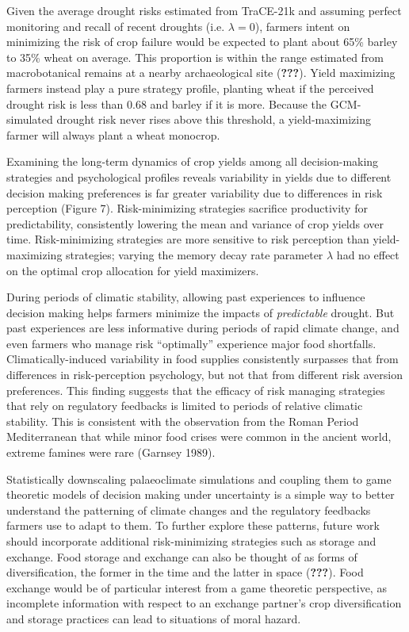 \documentclass[smallextended]{svjour3}       %
\begin{document}
Given the average drought risks estimated from TraCE-21k and assuming
perfect monitoring and recall of recent droughts (i.e. \(\lambda = 0\)),
farmers intent on minimizing the risk of crop failure would be expected
to plant about 65\% barley to 35\% wheat on average. This proportion is
within the range estimated from macrobotanical remains at a nearby
archaeological site ({\textbf{???}}). Yield maximizing farmers instead
play a pure strategy profile, planting wheat if the perceived drought
risk is less than 0.68 and barley if it is more. Because the
GCM-simulated drought risk never rises above this threshold, a
yield-maximizing farmer will always plant a wheat monocrop.

Examining the long-term dynamics of crop yields among all
decision-making strategies and psychological profiles reveals
variability in yields due to different decision making preferences is
far greater variability due to differences in risk perception (Figure
7). Risk-minimizing strategies sacrifice productivity for
predictability, consistently lowering the mean and variance of crop
yields over time. Risk-minimizing strategies are more sensitive to risk
perception than yield-maximizing strategies; varying the memory decay
rate parameter \(\lambda\) had no effect on the optimal crop allocation
for yield maximizers.

During periods of climatic stability, allowing past experiences to
influence decision making helps farmers minimize the impacts of
\emph{predictable} drought. But past experiences are less informative
during periods of rapid climate change, and even farmers who manage risk
``optimally'' experience major food shortfalls. Climatically-induced
variability in food supplies consistently surpasses that from
differences in risk-perception psychology, but not that from different
risk aversion preferences. This finding suggests that the efficacy of
risk managing strategies that rely on regulatory feedbacks is limited to
periods of relative climatic stability. This is consistent with the
observation from the Roman Period Mediterranean that while minor food
crises were common in the ancient world, extreme famines were rare
(Garnsey 1989).

Statistically downscaling palaeoclimate simulations and coupling them to
game theoretic models of decision making under uncertainty is a simple
way to better understand the patterning of climate changes and the
regulatory feedbacks farmers use to adapt to them. To further explore
these patterns, future work should incorporate additional
risk-minimizing strategies such as storage and exchange. Food storage
and exchange can also be thought of as forms of diversification, the
former in the time and the latter in space ({\textbf{???}}). Food
exchange would be of particular interest from a game theoretic
perspective, as incomplete information with respect to an exchange
partner's crop diversification and storage practices can lead to
situations of moral hazard.
\end{document}
